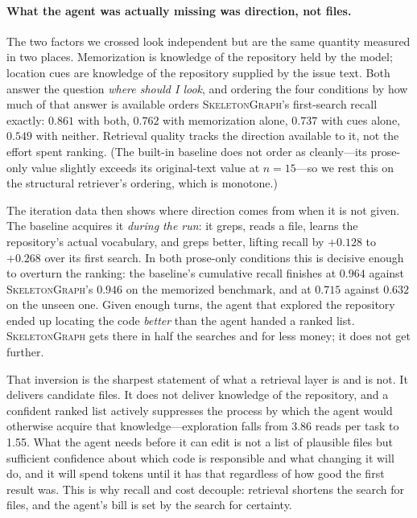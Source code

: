 \documentclass[11pt,letterpaper]{article}
\newcommand{\sg}{\textsc{SkeletonGraph}}
\begin{document}
\paragraph{What the agent was actually missing was direction, not files.}
The two factors we crossed look independent but are the same quantity measured in
two places. Memorization is knowledge of the repository held by the model; location
cues are knowledge of the repository supplied by the issue text. Both answer the
question \emph{where should I look}, and ordering the four conditions by how much of
that answer is available orders \sg{}'s first-search recall exactly: $0.861$ with
both, $0.762$ with memorization alone, $0.737$ with cues alone, $0.549$ with
neither. Retrieval quality tracks the direction available to it, not the effort
spent ranking. (The built-in baseline does not order as cleanly---its prose-only
value slightly exceeds its original-text value at $n=15$---so we rest this on the
structural retriever's ordering, which is monotone.)

The iteration data then shows where direction comes from when it is not given.
The baseline acquires it \emph{during the run}: it greps, reads a file, learns the
repository's actual vocabulary, and greps better, lifting recall by $+0.128$ to
$+0.268$ over its first search. In both prose-only conditions this is decisive
enough to overturn the ranking: the baseline's cumulative recall finishes at
$0.964$ against \sg{}'s $0.946$ on the memorized benchmark, and at $0.715$ against
$0.632$ on the unseen one. Given enough turns, the agent that explored the
repository ended up locating the code \emph{better} than the agent handed a ranked
list. \sg{} gets there in half the searches and for less money; it does not get
further.

That inversion is the sharpest statement of what a retrieval layer is and is not.
It delivers candidate files. It does not deliver knowledge of the repository, and
a confident ranked list actively suppresses the process by which the agent would
otherwise acquire that knowledge---exploration falls from 3.86 reads per task to
1.55. What the agent needs before it can edit is not a list of plausible files but
sufficient confidence about which code is responsible and what changing it will do,
and it will spend tokens until it has that regardless of how good the first result
was. This is why recall and cost decouple: retrieval shortens the search for files,
and the agent's bill is set by the search for certainty.
\end{document}
